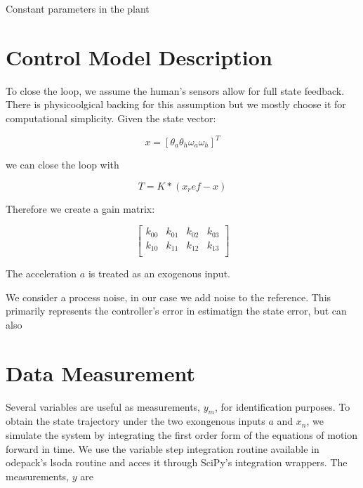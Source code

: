 \documentclass{article}
\begin{document}
\begin{table}
  \centering
  \caption{Constant parameters in the plant}
  
  \label{tab:model-constants}
\end{table}

\section{Control Model Description}

To close the loop, we assume the human's sensors allow for full state feedback.
There is physicoolgical backing for this assumption but we mostly choose it for
computational simplicity. Given the state vector:

\begin{equation}
  x = \left[\theta_a \theta_h \omega_a \omega_h \right]^T
\end{equation}

we can close the loop with

\begin{equation}
  T = K * (x_ref - x)
\end{equation}

Therefore we create a gain matrix:

\begin{equation}
  \begin{bmatrix}
    k_{00} & k_{01} & k_{02} & k_{03} \\
    k_{10} & k_{11} & k_{12} & k_{13} \\
  \end{bmatrix}
\end{equation}

The acceleration $a$ is treated as an exogenous input.

We consider a process noise, in our case we add noise to the reference. This
primarily represents the controller's error in estimatign the state error, but
can also

\section{Data Measurement}

Several variables are useful as measurements, $y_m$, for identification
purposes. To obtain the state trajectory under the two exongenous inputs $a$
and $x_n$, we simulate the system by integrating the first order form of the
equations of motion forward in time. We use the variable step integration
routine available in odepack's lsoda routine and acces it through SciPy's
integration wrappers. The measurements, $y$ are
\end{document}
